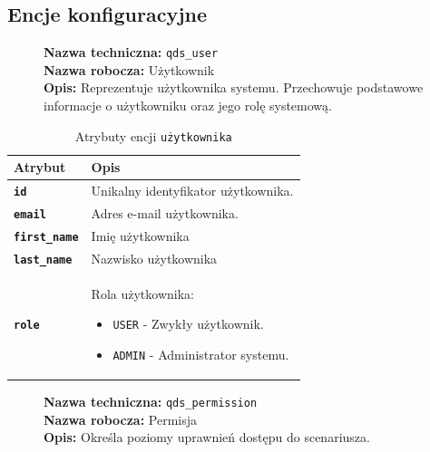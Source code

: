 \subsection{Encje konfiguracyjne}

\begin{figure}[H]
    \centering
    \begin{minipage}{0.8\textwidth} 
        \begin{framed}
            \noindent\textbf{\large Nazwa techniczna:} \texttt{qds\_user} \\
            \textbf{\large Nazwa robocza:} Użytkownik \\
            \textbf{\large Opis:} Reprezentuje użytkownika systemu. Przechowuje podstawowe informacje o użytkowniku 
            oraz jego rolę systemową.
        \end{framed}
    \end{minipage}
\end{figure}

\begin{table}[H]
    \centering
    \renewcommand{\arraystretch}{1.6}
    \begin{tabular}{|>{\bfseries}l|p{}|}
        \hline
        \rowcolor[HTML]{EFEFEF} \textbf{Atrybut} & \textbf{Opis} \\
        \hline
        \texttt{id} & Unikalny identyfikator użytkownika. \\
        \hline
        \texttt{email} & Adres e-mail użytkownika. \\
        \hline
        \texttt{first\_name} & Imię użytkownika \\
        \hline
        \texttt{last\_name} & Nazwisko użytkownika \\
        \hline
        \texttt{role} & Rola użytkownika:
        \begin{itemize}
            \item \texttt{USER} - Zwykły użytkownik.
            \item \texttt{ADMIN} - Administrator systemu.
        \end{itemize} \\
        \hline
    \end{tabular}
    \caption{Atrybuty encji \texttt{użytkownika}}
\end{table}

\begin{figure}[H]
    \centering
    \begin{minipage}{0.8\textwidth} 
        \begin{framed}
            \noindent\textbf{\large Nazwa techniczna:} \texttt{qds\_permission} \\
            \textbf{\large Nazwa robocza:} Permisja \\
            \textbf{\large Opis:} Określa poziomy uprawnień dostępu do scenariusza.
        \end{framed}
    \end{minipage}
\end{figure}

